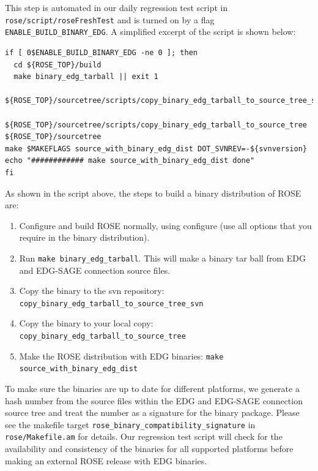 This step is automated in our daily regression test script in {\tt
rose/script/roseFreshTest} and is turned on by a flag
{\tt ENABLE\_BUILD\_BINARY\_EDG}. A simplified excerpt of the script is shown below:
\begin{verbatim}
if [ 0$ENABLE_BUILD_BINARY_EDG -ne 0 ]; then
  cd ${ROSE_TOP}/build
  make binary_edg_tarball || exit 1
  ${ROSE_TOP}/sourcetree/scripts/copy_binary_edg_tarball_to_source_tree_svn 
  ${ROSE_TOP}/sourcetree/scripts/copy_binary_edg_tarball_to_source_tree ${ROSE_TOP}/sourcetree 
make $MAKEFLAGS source_with_binary_edg_dist DOT_SVNREV=-${svnversion}
echo "############ make source_with_binary_edg_dist done"
fi
\end{verbatim}


As shown in the script above, the steps to build a binary distribution of ROSE are:
\begin{enumerate}
   \item Configure and build ROSE normally, using configure (use all options that you
    require in the binary distribution).  
    \item Run {\tt make binary\_edg\_tarball}. This will make a binary tar
    ball from EDG and EDG-SAGE connection source files. 
    \item Copy the binary to the svn repository: {\tt copy\_binary\_edg\_tarball\_to\_source\_tree\_svn} 
    \item Copy the binary to your local copy: {\tt copy\_binary\_edg\_tarball\_to\_source\_tree}
     \item Make the ROSE distribution with EDG binaries: {\tt make source\_with\_binary\_edg\_dist}
\end{enumerate}
To make sure the binaries are up to date for different platforms, 
we generate a hash number from the source files within the EDG and EDG-SAGE connection source tree and 
treat the number as a signature for the binary package. 
Please see the makefile target {\tt rose\_binary\_compatibility\_signature} in {\tt rose/Makefile.am} for details.
Our regression test script will check for the availability and consistency of the binaries for all supported platforms 
before making an external ROSE release with EDG binaries.

